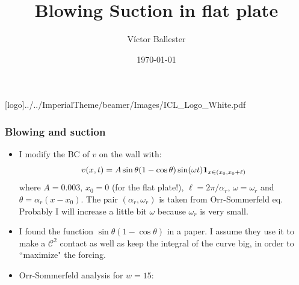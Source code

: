 \documentclass[
  aspectratio=169, %
  t, %
  onlytextwidth, %
  10pt, %
]{beamer}
\title{Blowing Suction in flat plate} %
\subtitle{} %
\author{Víctor Ballester} %
\date{\today} %
\def\imagefolder{../../ImperialTheme/beamer/Images}
\begin{document}
\begingroup
{} %
[logo]{\imagefolder/ICL_Logo_White.pdf} %
\frame[plain, s]{\titlepage} %
\endgroup

\begin{frame}
	\frametitle{Blowing and suction}
	\begin{itemize}
		\item I modify the BC of $v$ on the wall with:
		      $$
			      v(x,t)= A \sin\theta(1-\cos\theta)\sin(\omega t) {\bf{1}}_{x\in (x_0, x_0 + \ell)}
		      $$
		      where $A=0.003$, $x_0=0$ (for the flat plate!), $\ell = 2\pi/\alpha_r$, $\omega=\omega_r$ and $\theta = \alpha_r (x-x_0)$. The pair $(\alpha_r, \omega_r)$ is taken from Orr-Sommerfeld eq. Probably I will increase a little bit $\omega$ because $\omega_r$ is very small.
		\item I found the function $\sin\theta (1-\cos\theta)$ in a paper. I assume they use it to make a $\mathcal{C}^2$ contact as well as keep the integral of the curve big, in order to ``maximize" the forcing.
		\item Orr-Sommerfeld analysis for $w=15$:
	\end{itemize}


\end{frame}
\end{document}
